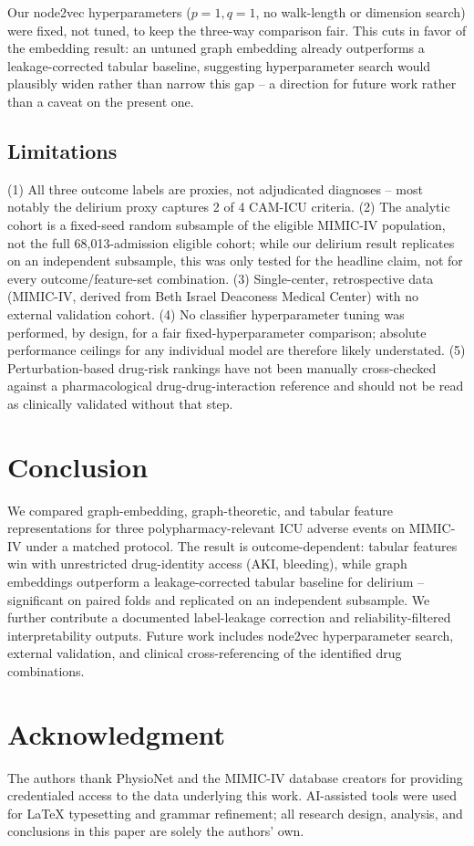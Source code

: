 \documentclass[conference]{IEEEtran}
\begin{document}
Our node2vec hyperparameters ($p{=}1,q{=}1$, no walk-length or dimension
search) were fixed, not tuned, to keep the three-way comparison fair. This
cuts in favor of the embedding result: an untuned graph embedding already
outperforms a leakage-corrected tabular baseline, suggesting hyperparameter
search would plausibly widen rather than narrow this gap -- a direction for
future work rather than a caveat on the present one.

\subsection{Limitations}
\label{sec:limitations}

(1) All three outcome labels are proxies, not adjudicated diagnoses --
most notably the delirium proxy captures 2 of 4 CAM-ICU criteria. (2) The
analytic cohort is a fixed-seed random subsample of the eligible MIMIC-IV
population, not the full 68{,}013-admission eligible cohort; while our
delirium result replicates on an independent subsample, this was only
tested for the headline claim, not for every outcome/feature-set
combination. (3) Single-center, retrospective data (MIMIC-IV, derived from
Beth Israel Deaconess Medical Center) with no external validation cohort.
(4) No classifier hyperparameter tuning was performed, by design, for a
fair fixed-hyperparameter comparison; absolute performance ceilings for any
individual model are therefore likely understated. (5) Perturbation-based
drug-risk rankings have not been manually cross-checked against a
pharmacological drug-drug-interaction reference and should not be read as
clinically validated without that step.

\section{Conclusion}

We compared graph-embedding, graph-theoretic, and tabular feature
representations for three polypharmacy-relevant ICU adverse events on
MIMIC-IV under a matched protocol. The result is outcome-dependent: tabular
features win with unrestricted drug-identity access (AKI, bleeding), while
graph embeddings outperform a leakage-corrected tabular baseline for
delirium -- significant on paired folds and replicated on an independent
subsample. We further contribute a documented label-leakage correction and
reliability-filtered interpretability outputs. Future work includes node2vec
hyperparameter search, external validation, and clinical cross-referencing
of the identified drug combinations.

\section*{Acknowledgment}
The authors thank PhysioNet and the MIMIC-IV database creators for
providing credentialed access to the data underlying this work. AI-assisted
tools were used for \LaTeX{} typesetting and grammar refinement; all
research design, analysis, and conclusions in this paper are solely the
authors' own.



\end{document}
